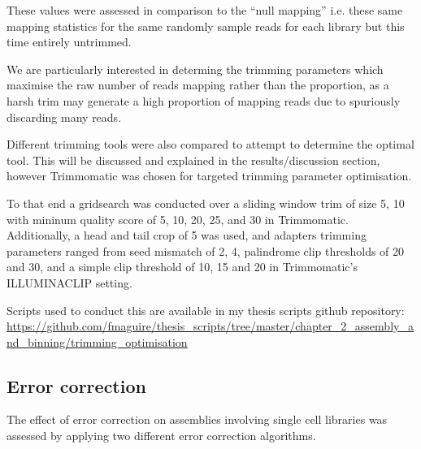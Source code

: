 These values were assessed in comparison to the ``null mapping'' i.e. these same mapping statistics for the same
randomly sample reads for each library but this time entirely untrimmed.  

%
%
%
%
%
%


We are particularly interested in determing the trimming parameters which maximise the raw number of reads mapping rather than
the proportion, as a harsh trim may generate a high proportion of mapping reads due to spuriously discarding 
many reads.  


Different trimming tools were also compared to attempt to determine the optimal tool.
This will be discussed and explained in the results/discussion section, however Trimmomatic \citep{Bolger2014a}
was chosen for targeted trimming parameter optimisation.

To that end a gridsearch was conducted over a sliding window trim of size 5, 10 
with mininum quality score of 5, 10, 20, 25, and 30 in Trimmomatic.  Additionally, 
a head and tail crop of 5 was used, and adapters trimming parameters
ranged from seed mismatch of 2, 4, palindrome clip thresholds of 20 and 30, 
and a simple clip threshold of 10, 15 and 20 in Trimmomatic's ILLUMINACLIP setting.

Scripts used to conduct this are available in my thesis scripts github repository:
\url{https://github.com/fmaguire/thesis_scripts/tree/master/chapter_2_assembly_and_binning/trimming_optimisation}


\subsection{Error correction}

The effect of error correction on assemblies involving single cell libraries was assessed 
by applying two different error correction algorithms. 

